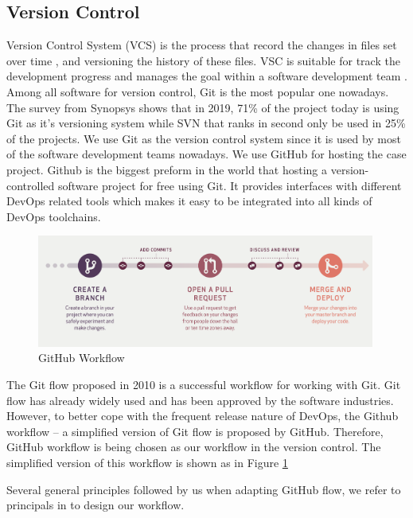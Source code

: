 \subsection{Version Control}
Version Control System (VCS) is the process that record the changes in files set over time \cite{GitAbout93:online}, and versioning the history of these files. VSC is suitable for track the development progress and manages the goal within a software development team \cite{loeliger2012version}. Among all software for version control, Git is the most popular one nowadays. The survey \cite{CompareR31:online} from Synopsys shows that in 2019, 71\% of the project today is using Git as it's versioning system while SVN that ranks in second only be used in 25\% of the projects. We use Git as the version control system since it is used by most of the software development teams nowadays. We use GitHub for hosting the case project. Github is the biggest preform in the world that hosting a version-controlled software project for free using Git. It provides interfaces with different DevOps related tools which makes it easy to be integrated into all kinds of DevOps toolchains.
\begin{figure}[h]
\centering
\includegraphics[width=0.99\textwidth]{pics/git.png}
\caption{GitHub Workflow \cite{guides2013understanding}}
\label{fig:git}
\end{figure}
\par
The Git flow \cite{driessen2010successful} proposed in 2010 is a successful workflow for working with Git. Git flow has already widely used and has been approved by the software industries. However, to better cope with the frequent release nature of DevOps, the Github workflow -- a simplified version of Git flow is proposed by GitHub.
Therefore, GitHub workflow \cite{chacongithub} is being chosen as our workflow in the version control. The simplified version of this workflow is shown as in Figure \ref{fig:git}
\par
Several general principles followed by us when adapting GitHub flow, we refer to principals in \cite{chacongithub} to design our workflow.

